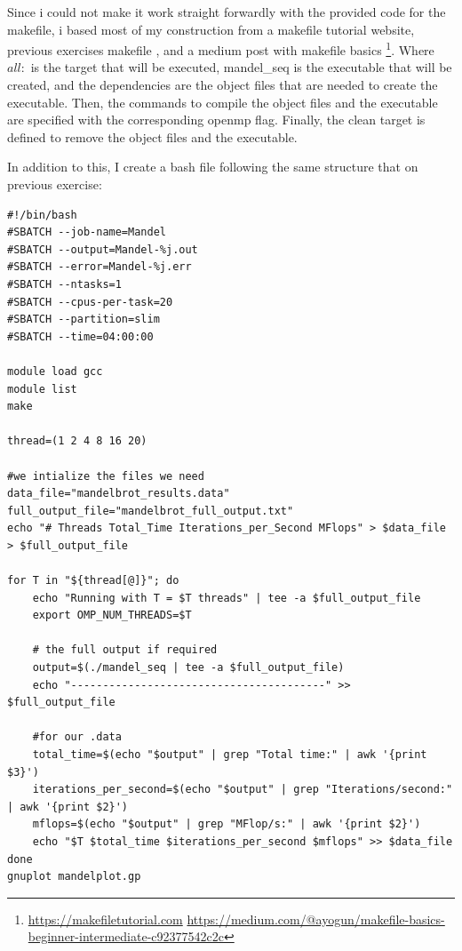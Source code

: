 \documentclass[unicode,11pt,a4paper,oneside,numbers=endperiod,openany]{scrartcl}
\begin{document}
Since i could not make it work straight forwardly with the provided code for the makefile, i based most of my construction from 
a makefile tutorial website, previous exercises makefile , and a medium post with makefile basics \footnote{\url{https://makefiletutorial.com}
\newline
\url{https://medium.com/@ayogun/makefile-basics-beginner-intermediate-c92377542c2c}}.
Where $all:$ is the target that will be executed, mandel\_seq is the executable that will be created, and the dependencies are the object files that are needed to create the executable. 
Then, the commands to compile the object files and the executable are specified with the corresponding 
openmp flag. Finally, the clean target is defined to remove the object files and the executable.

In addition to this, I create a bash file following the same structure that on previous exercise: 
\begin{lstlisting}
#!/bin/bash
#SBATCH --job-name=Mandel
#SBATCH --output=Mandel-%j.out
#SBATCH --error=Mandel-%j.err
#SBATCH --ntasks=1
#SBATCH --cpus-per-task=20
#SBATCH --partition=slim
#SBATCH --time=04:00:00

module load gcc
module list
make

thread=(1 2 4 8 16 20)

#we intialize the files we need
data_file="mandelbrot_results.data"
full_output_file="mandelbrot_full_output.txt"
echo "# Threads Total_Time Iterations_per_Second MFlops" > $data_file
> $full_output_file

for T in "${thread[@]}"; do
    echo "Running with T = $T threads" | tee -a $full_output_file
    export OMP_NUM_THREADS=$T
    
    # the full output if required
    output=$(./mandel_seq | tee -a $full_output_file)
    echo "----------------------------------------" >> $full_output_file
    
    #for our .data
    total_time=$(echo "$output" | grep "Total time:" | awk '{print $3}')
    iterations_per_second=$(echo "$output" | grep "Iterations/second:" | awk '{print $2}')
    mflops=$(echo "$output" | grep "MFlop/s:" | awk '{print $2}')
    echo "$T $total_time $iterations_per_second $mflops" >> $data_file
done
gnuplot mandelplot.gp
\end{lstlisting}
\end{document}
